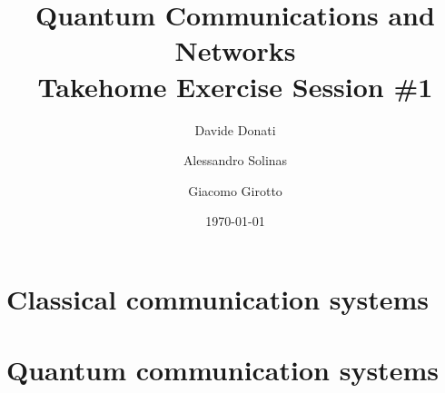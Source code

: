 \documentclass[11pt,a4paper]{article}
\title{Quantum Communications and Networks\\Takehome Exercise Session \#1}
\author{Davide Donati \and Alessandro Solinas \and Giacomo Girotto}
\date{\today}
\begin{document}
\maketitle

\setcounter{section}{1}
\section{Classical communication systems}





\section{Quantum communication systems}




\end{document}
